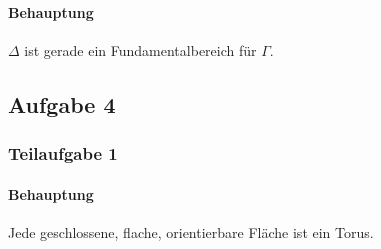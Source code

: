 \documentclass{book}
\begin{document}
\paragraph{Behauptung}
$\Delta$ ist gerade ein Fundamentalbereich für $\Gamma$.


\subsection{Aufgabe 4}
\subsubsection{Teilaufgabe 1}
\paragraph{Behauptung}
Jede geschlossene, flache, orientierbare Fläche ist ein Torus.
\end{document}
